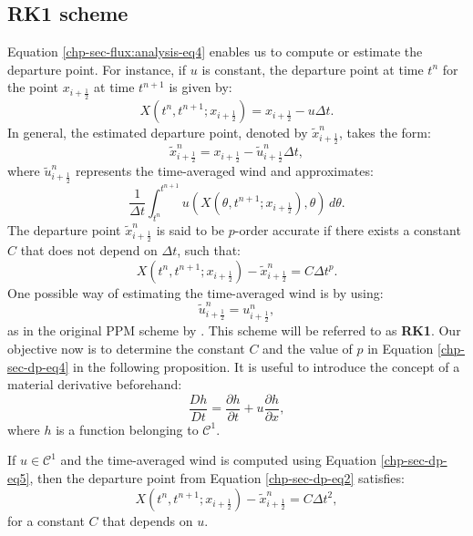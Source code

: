 \subsection{RK1 scheme}
Equation \eqref{chp-sec-flux:analysis-eq4} enables us to compute or estimate the departure point.
For instance, if $u$ is constant, the departure point at time $t^n$ for the point $x_{i+\frac{1}{2}}$ at time $t^{n+1}$ is given by:
\begin{equation}
	\label{chp-sec-dp-eq1}
	X(t^n,t^{n+1};x_{i+\frac{1}{2}}) = x_{i+\frac{1}{2}} - u\Delta t.
\end{equation}
In general, the estimated departure point, denoted by $\tilde{x}_{i+\frac{1}{2}}^n$, takes the form:
\begin{equation}
	\label{chp-sec-dp-eq2}
	\tilde{x}_{i+\frac{1}{2}}^n = x_{i+\frac{1}{2}} - \tilde{u}^{n}_{i+\frac{1}{2}}\Delta t,
\end{equation}
where $\tilde{u}^{n}_{i+\frac{1}{2}}$ represents the time-averaged wind and approximates:
\begin{equation}
	\label{chp-sec-dp-eq3}
	\frac{1}{\Delta t}\int_{t^n}^{t^{n+1}}u(X(\theta,t^{n+1};x_{i+\frac{1}{2}}),\theta) \,d\theta.
\end{equation}
The departure point $\tilde{x}_{i+\frac{1}{2}}^n$ is said to be $p$-order accurate if there exists a constant $C$ that does not depend on $\Delta t$, such that:
\begin{equation}
	\label{chp-sec-dp-eq4}
	X(t^n,t^{n+1};x_{i+\frac{1}{2}}) - \tilde{x}_{i+\frac{1}{2}}^n = C\Delta t^p.
\end{equation}
One possible way of estimating the time-averaged wind is by using:
\begin{equation}
	\label{chp-sec-dp-eq5}
	\tilde{u}^n_{i+\frac{1}{2}} = u^n_{i+\frac{1}{2}},
\end{equation}
as in the original PPM scheme by \citet{colella:1984}. This scheme will be referred to as \textbf{RK1}.
Our objective now is to determine the constant $C$ and the value of $p$ in Equation \eqref{chp-sec-dp-eq4}
in the following proposition. It is useful to introduce the concept of a material derivative beforehand:
\begin{equation*}
	\frac{Dh}{Dt} = \frac{\partial h}{\partial t} + u\frac{\partial h}{\partial x},
\end{equation*}
where $h$ is a function belonging to $\mathcal{C}^1$.
\begin{prop}
	\label{chp-sec-flux:dp_euler}
	If $u\in \mathcal{C}^1$ and the time-averaged wind is computed using Equation \eqref{chp-sec-dp-eq5}, then the departure point from Equation \eqref{chp-sec-dp-eq2} satisfies:
	\begin{equation}
		X(t^n,t^{n+1};x_{i+\frac{1}{2}}) - \tilde{x}_{i+\frac{1}{2}}^n = C\Delta t^2,
	\end{equation}
	for a constant $C$ that depends on $u$.
\end{prop}
